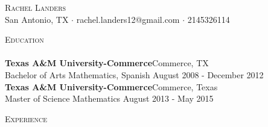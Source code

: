 \documentclass[a4paper]{article}
\newcommand{\lineunder} {
    \vspace*{-8pt} \\
    \hspace*{-18pt} \hrulefill \\
}
\newcommand{\header} [1] {
    {\hspace*{-18pt}\vspace*{6pt} \textsc{#1}}
    \vspace*{-6pt} \lineunder
}
\begin{document}
\vspace*{-40pt}

    

\vspace*{-10pt}
\begin{center}
	{\Huge \scshape {Rachel Landers}}\\
	San Antonio, TX $\cdot$ rachel.landers12@gmail.com $\cdot$ 2145326114\\
\end{center}

\header{Education}
\textbf{Texas A\&M University-Commerce}\hfill Commerce, TX\\
Bachelor of Arts Mathematics, Spanish \hfill August 2008 - December 2012\\
\vspace{2mm}
\textbf{Texas A\&M University-Commerce}\hfill Commerce, Texas\\
Master of Science Mathematics \hfill August 2013 - May 2015\\
\vspace{2mm}

\header{Experience}
\vspace{1mm}
\end{document}

